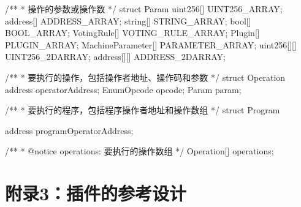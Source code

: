 \documentclass[main.tex]{subfiles}
\begin{document}
\begin{spverbatim}

/**
  * 操作的参数或操作数
  */
struct Param {
  uint256[] UINT256_ARRAY;
  address[] ADDRESS_ARRAY;
  string[] STRING_ARRAY;
  bool[] BOOL_ARRAY;
  VotingRule[] VOTING_RULE_ARRAY;
  Plugin[] PLUGIN_ARRAY;
  MachineParameter[] PARAMETER_ARRAY;
  uint256[][] UINT256_2DARRAY;
  address[][] ADDRESS_2DARRAY;
}

/**
  * 要执行的操作，包括操作者地址、操作码和参数
  */
struct Operation {
  address operatorAddress;
  EnumOpcode opcode;
  Param param;
}

/**
  * 要执行的程序，包括程序操作者地址和操作数组
  */
struct Program {
  address programOperatorAddress;

  /**
   * @notice operations: 要执行的操作数组
   */
  Operation[] operations;
}

\end{spverbatim}

\section*{附录3：插件的参考设计}
\end{document}
